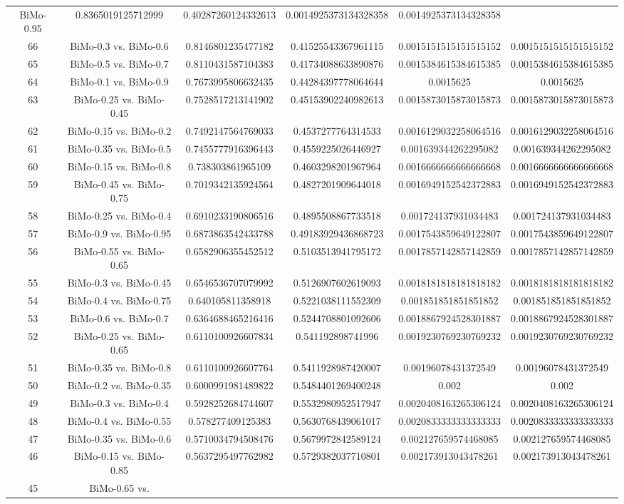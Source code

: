 \documentclass[a4paper,10pt]{article}
\begin{document}
\begin{landscape}
\begin{table}[!htp]
\begin{tabular}{cccccc}
BiMo-0.95&0.8365019125712999&0.40287260124332613&0.0014925373134328358&0.0014925373134328358\\66&BiMo-0.3 vs. BiMo-0.6&0.8146801235477182&0.41525543367961115&0.0015151515151515152&0.0015151515151515152\\65&BiMo-0.5 vs. BiMo-0.7&0.8110431587104383&0.41734088633890876&0.0015384615384615385&0.0015384615384615385\\64&BiMo-0.1 vs. BiMo-0.9&0.7673995806632435&0.44284397778064644&0.0015625&0.0015625\\63&BiMo-0.25 vs. BiMo-0.45&0.7528517213141902&0.45153902240982613&0.0015873015873015873&0.0015873015873015873\\62&BiMo-0.15 vs. BiMo-0.2&0.7492147564769033&0.4537277764314533&0.0016129032258064516&0.0016129032258064516\\61&BiMo-0.35 vs. BiMo-0.5&0.7455777916396443&0.4559225026446927&0.001639344262295082&0.001639344262295082\\60&BiMo-0.15 vs. BiMo-0.8&0.738303861965109&0.4603298201967964&0.0016666666666666668&0.0016666666666666668\\59&BiMo-0.45 vs. BiMo-0.75&0.7019342135924564&0.4827201909644018&0.0016949152542372883&0.0016949152542372883\\58&BiMo-0.25 vs. BiMo-0.4&0.6910233190806516&0.4895508867733518&0.001724137931034483&0.001724137931034483\\57&BiMo-0.9 vs. BiMo-0.95&0.6873863542433788&0.49183929436868723&0.0017543859649122807&0.0017543859649122807\\56&BiMo-0.55 vs. BiMo-0.65&0.6582906355452512&0.5103513941795172&0.0017857142857142859&0.0017857142857142859\\55&BiMo-0.3 vs. BiMo-0.45&0.6546536707079992&0.5126907602619093&0.0018181818181818182&0.0018181818181818182\\54&BiMo-0.4 vs. BiMo-0.75&0.640105811358918&0.5221038111552309&0.001851851851851852&0.001851851851851852\\53&BiMo-0.6 vs. BiMo-0.7&0.6364688465216416&0.5244708801092606&0.0018867924528301887&0.0018867924528301887\\52&BiMo-0.25 vs. BiMo-0.65&0.6110100926607834&0.541192898741996&0.0019230769230769232&0.0019230769230769232\\51&BiMo-0.35 vs. BiMo-0.8&0.6110100926607764&0.5411928987420007&0.00196078431372549&0.00196078431372549\\50&BiMo-0.2 vs. BiMo-0.35&0.6000991981489822&0.5484401269400248&0.002&0.002\\49&BiMo-0.3 vs. BiMo-0.4&0.5928252684744607&0.5532980952517947&0.0020408163265306124&0.0020408163265306124\\48&BiMo-0.4 vs. BiMo-0.55&0.578277409125383&0.5630768439061017&0.0020833333333333333&0.0020833333333333333\\47&BiMo-0.35 vs. BiMo-0.6&0.5710034794508476&0.5679972842589124&0.002127659574468085&0.002127659574468085\\46&BiMo-0.15 vs. BiMo-0.85&0.5637295497762982&0.5729382037710801&0.002173913043478261&0.002173913043478261\\45&BiMo-0.65 vs. 
\end{tabular}
\end{table}
\end{landscape}
\end{document}
